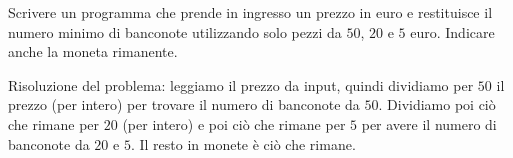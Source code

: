 \begin{Exercise}[label={ex:resto}]
  Scrivere un programma che prende in ingresso un prezzo in euro e restituisce il numero minimo di banconote utilizzando solo pezzi da $50$, $20$ e $5$ euro. Indicare anche la moneta rimanente.
\end{Exercise}

\begin{Answer}[ref={ex:resto}]
		Risoluzione del problema: leggiamo il prezzo da input, quindi dividiamo per $50$ il prezzo (per intero) per trovare il numero di banconote da $50$. Dividiamo poi ci\`o che rimane per $20$ (per intero) e poi ci\`o che rimane per $5$ per avere il numero di banconote da $20$ e $5$. Il resto in monete \`e ci\`o che rimane.

    
\end{Answer}